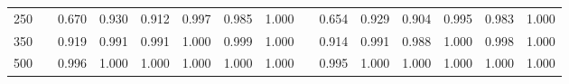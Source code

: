 % 
\begin{tabular}{ccccccccccccccc}
  \hline
  \hline
250 &  & 0.670 & 0.930 & 0.912 & 0.997 & 0.985 & 1.000 &  & 0.654 & 0.929 & 0.904 & 0.995 & 0.983 & 1.000 \\ 
  350 &  & 0.919 & 0.991 & 0.991 & 1.000 & 0.999 & 1.000 &  & 0.914 & 0.991 & 0.988 & 1.000 & 0.998 & 1.000 \\ 
  500 &  & 0.996 & 1.000 & 1.000 & 1.000 & 1.000 & 1.000 &  & 0.995 & 1.000 & 1.000 & 1.000 & 1.000 & 1.000 \\ 
   \hline
\end{tabular}
